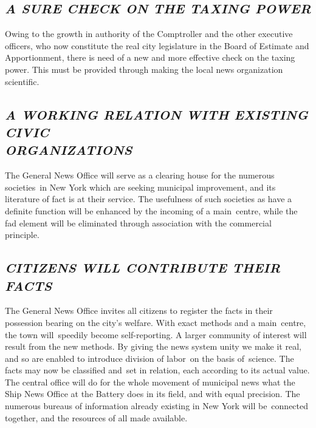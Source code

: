 \documentclass[openany,nobib]{tufte-book}
\begin{document}
\hypertarget{a-sure-check-on-the-taxing-power}{%
\subsection{\emph{A SURE CHECK ON THE TAXING
POWER}}\label{a-sure-check-on-the-taxing-power}}

Owing to the growth in authority of the Comptroller and the other
executive officers, who now constitute the real city legislature in the
Board of Estimate and Apportionment, there is need of a new and more
effective check on the taxing power. This must be provided through
making the local news organization scientific.~

\hypertarget{a-working-relation-with-existing-civic-organizations}{%
\subsection{\emph{A WORKING RELATION WITH EXISTING CIVIC\\\noindent ORGANIZATIONS}}\label{a-working-relation-with-existing-civic-organizations}}

The General News Office will serve as a clearing house for the numerous
societies~in New York which are seeking municipal improvement, and its
literature of fact is at their service. The usefulness of such societies
as have a definite function will be enhanced by the incoming of a
main~centre, while the fad element will be eliminated through
association with the commercial principle.~

\hypertarget{citizens-will-contribute-their-facts}{%
\subsection{\emph{CITIZENS WILL CONTRIBUTE THEIR
FACTS}}\label{citizens-will-contribute-their-facts}}

The General News Office invites all citizens to register the facts in
their possession bearing on the city's welfare. With exact methods and a
main~centre, the town will~speedily become self-reporting. A larger
community of interest will result from the new methods. By giving the
news system unity we make it real, and so are enabled to introduce
division of labor~on the basis of~science. The facts may now be
classified and~set in relation, each according to its actual value. The
central office will do for the whole movement of municipal news what the
Ship News Office at the Battery does in its field, and with equal
precision. The numerous bureaus of information already existing in New
York will be~connected together, and the resources of all made
available.~
\end{document}
